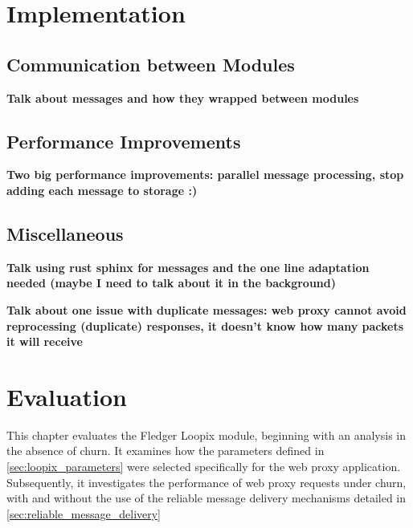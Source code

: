 \documentclass[a4paper,11pt,oneside]{report}
\begin{document}
\chapter{Implementation}
\label{sec:implementation}


\section{Communication between Modules}
\textbf{Talk about messages and how they wrapped between modules}

\section{Performance Improvements}
\textbf{Two big performance improvements: parallel message processing, stop adding each message to storage :)}

\section{Miscellaneous}
\textbf{Talk using rust sphinx for messages and the one line adaptation needed (maybe I need to talk about it in the background)}

\textbf{Talk about one issue with duplicate messages: web proxy cannot avoid reprocessing (duplicate) responses, it doesn't know how many packets it will receive}

\chapter{Evaluation}


This chapter evaluates the Fledger Loopix module, beginning with an analysis in the absence of churn. It examines how the parameters defined in \autoref{sec:loopix_parameters} were selected specifically for the web proxy application. Subsequently, it investigates the performance of web proxy requests under churn, with and without the use of the reliable message delivery mechanisms detailed in \autoref{sec:reliable_message_delivery}
\end{document}
